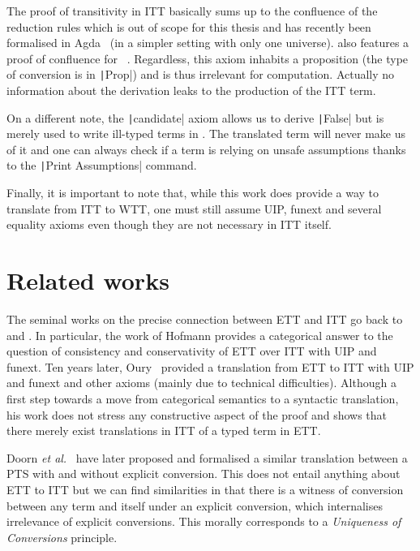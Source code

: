 The proof of transitivity in \acrshort{ITT} basically sums up to the confluence
of the reduction rules which is out of scope for this thesis and has recently
been formalised in Agda~ (in a simpler
setting with only one universe).
\MetaCoq also features a proof of confluence for
\Coq~.
Regardless, this axiom inhabits a proposition (the type of conversion is in
\texttt|Prop|) and is thus irrelevant for computation. Actually no
information about the derivation leaks to the production of the \acrshort{ITT}
term.

On a different note, the \texttt|candidate| axiom allows us to derive
\texttt|False| but is merely used to write ill-typed terms in \Coq.
The translated term will never make us of it and one can always check if a
term is relying on unsafe assumptions thanks to the
\texttt|Print Assumptions| command.

Finally, it is important to note that, while this work does provide a
way to translate from \acrshort{ITT} to \acrshort{WTT}, one must still assume
\acrshort{UIP}, \acrshort{funext} and several equality axioms even though they
are not necessary in \acrshort{ITT} itself.

\section{Related works}
\label{sec:related-works}

The seminal works on the precise connection between \acrshort{ETT} and
\acrshort{ITT} go back to  and
.
%
In particular, the work of Hofmann provides a categorical answer to
the question of consistency and conservativity of \acrshort{ETT} over
\acrshort{ITT} with \acrshort{UIP} and \acrshort{funext}.
%
Ten years later, Oury~
provided a translation from \acrshort{ETT} to \acrshort{ITT} with
\acrshort{UIP} and \acrshort{funext} and other axioms (mainly due to
technical difficulties).
%
Although a first step towards a move from categorical semantics to a
syntactic translation, his work does not stress any constructive
aspect of the proof and shows that there merely exist translations in
\acrshort{ITT} of a typed term in \acrshort{ETT}.

Doorn \emph{et al.}~ have later proposed and
formalised a similar translation between a \acrshort{PTS} with and without
explicit conversion. This does not entail anything about \acrshort{ETT} to
\acrshort{ITT} but we can find similarities in that there is a witness of
conversion between any term and itself under an explicit conversion, which
internalises irrelevance of explicit conversions. This morally corresponds to a
\emph{Uniqueness of Conversions} principle.

